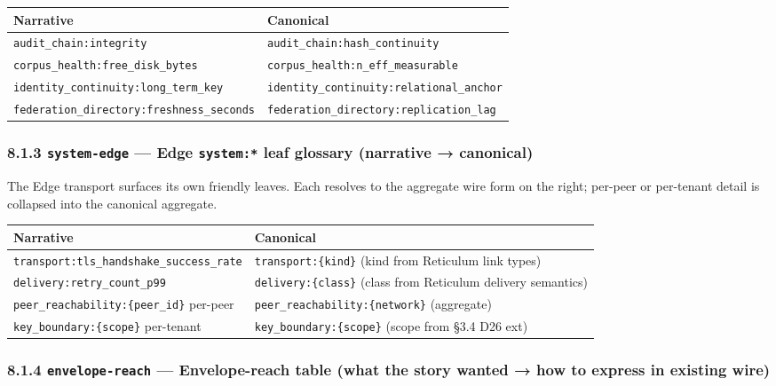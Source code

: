 \documentclass[11pt]{article}
\begin{document}
{\footnotesize
\begin{longtable}{|p{8.0cm}|p{8.0cm}|}\hline
\textbf{Narrative} & \textbf{Canonical} \\ \hline\endhead
\texttt{audit\_chain:integrity} & \texttt{audit\_chain:hash\_continuity} \\ \hline
\texttt{corpus\_health:free\_disk\_bytes} & \texttt{corpus\_health:n\_eff\_measurable} \\ \hline
\texttt{identity\_continuity:long\_term\_key} & \texttt{identity\_continuity:relational\_anchor} \\ \hline
\texttt{federation\_directory:freshness\_seconds} & \texttt{federation\_directory:replication\_lag} \\ \hline
\end{longtable}}


\subsubsection*{8.1.3 \texttt{system-edge} — Edge \texttt{system:*} leaf glossary (narrative → canonical)}


The Edge transport surfaces its own friendly leaves. Each resolves to the aggregate wire form on the right; per-peer or per-tenant detail is collapsed into the canonical aggregate.


{\footnotesize
\begin{longtable}{|p{8.0cm}|p{8.0cm}|}\hline
\textbf{Narrative} & \textbf{Canonical} \\ \hline\endhead
\texttt{transport:tls\_handshake\_success\_rate} & \texttt{transport:\{kind\}} (kind from Reticulum link types) \\ \hline
\texttt{delivery:retry\_count\_p99} & \texttt{delivery:\{class\}} (class from Reticulum delivery semantics) \\ \hline
\texttt{peer\_reachability:\{peer\_id\}} per-peer & \texttt{peer\_reachability:\{network\}} (aggregate) \\ \hline
\texttt{key\_boundary:\{scope\}} per-tenant & \texttt{key\_boundary:\{scope\}} (scope from §3.4 D26 ext) \\ \hline
\end{longtable}}


\subsubsection*{8.1.4 \texttt{envelope-reach} — Envelope-reach table (what the story wanted → how to express in existing wire)}
\end{document}
